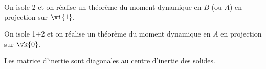 On isole 2 et on réalise un théorème du moment dynamique en $B$ (ou $A$) en projection sur $\vi{1}$.

On isole 1+2 et on réalise un théorème du moment dynamique en $A$ en projection sur $\vk{0}$.
\else
\fi


\ifcolle
Les matrice d'inertie sont diagonales au centre d'inertie des solides.


\else
\fi

\ifprof
\else


\fi

